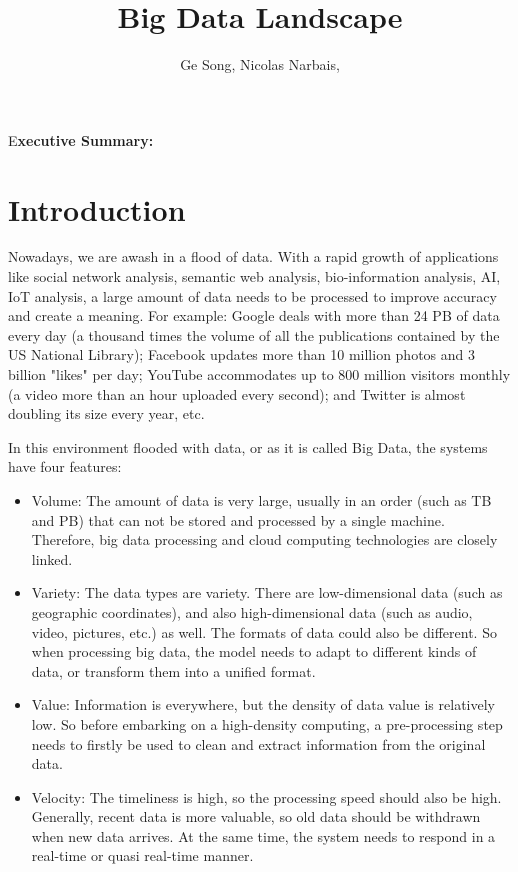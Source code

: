 \documentclass[	DIV=calc,%
							paper=a4,%
							fontsize=11pt,%
							twocolumn]{scrartcl}	 					%
\title{Big Data Landscape}					%
\author{Ge Song, Nicolas Narbais, }											%
\date{}																				%
\newcommand{\initial}[1]{%
     \lettrine[lines=3,lhang=0.3,nindent=0em]{
     				\color{DarkBlue}
     				{\textsf{#1}}}{}}
\begin{document}
\maketitle
\thispagestyle{fancy} 			%
\initial{E}\textbf{xecutive Summary: }


\section*{\color{DarkOrange}Introduction}
Nowadays, we are awash in a flood of data. With a rapid growth of applications like social network analysis, semantic web analysis, bio-information analysis, AI, IoT analysis, a large amount of data needs to be processed to improve accuracy and create a meaning. For example: Google deals with more than 24 PB of data every day (a thousand times the volume of all the publications contained by the US National Library); Facebook updates more than 10 million photos and 3 billion "likes" per day; YouTube accommodates up to 800 million visitors monthly (a video more than an hour uploaded every second); and Twitter is almost doubling its size every year, etc.

In this environment flooded with data, or as it is called Big Data, the systems have four features:

\begin{itemize}

\item Volume: The amount of data is very large, usually in an order (such as TB and PB) that can not be stored and processed by a single machine. Therefore, big data processing and cloud computing technologies are closely linked.

\item Variety: The data types are variety. There are low-dimensional data (such as geographic coordinates), and also high-dimensional data (such as audio, video, pictures, etc.) as well. The formats of data could also be different. So when processing big data, the model needs to adapt to different kinds of data, or transform them into a unified format.

\item Value: Information is everywhere, but the density of data value is relatively low. So before embarking on a high-density computing, a pre-processing step needs to firstly be used to clean and extract information from the original data.

\item Velocity: The timeliness is high, so the processing speed should also be high. Generally, recent data is more valuable, so old data should be withdrawn when new data arrives. At the same time, the system needs to respond in a real-time or quasi real-time manner. 

\end{itemize}
\end{document}
